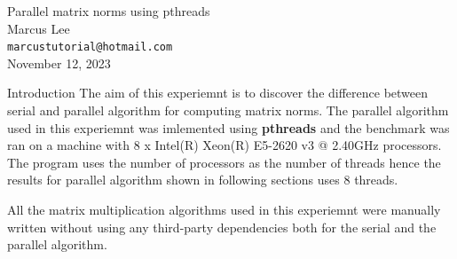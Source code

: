 \documentclass[12pt]{article}
\begin{document}
\begin{center}
    {\LARGE Parallel matrix norms using pthreads} \\[0.6cm]

    Marcus Lee \\
    \texttt{\small marcustutorial@hotmail.com} \\[0.3cm]

    \small November 12, 2023
\end{center}

\begin{section}{Introduction}
 The aim of this experiemnt is to discover the difference between serial and parallel algorithm for computing matrix norms. The
 parallel algorithm used in this experiemnt was imlemented using \textbf{pthreads} and the benchmark was ran on a machine with 8 x Intel(R) Xeon(R) E5-2620 v3 @ 2.40GHz processors.
 The program uses the number of processors as the number of threads hence the results for parallel algorithm shown in following sections uses 8 threads.

 All the matrix multiplication algorithms used in this experiemnt were manually written without using any third-party dependencies both for
 the serial and the parallel algorithm.
\end{section}
\end{document}
